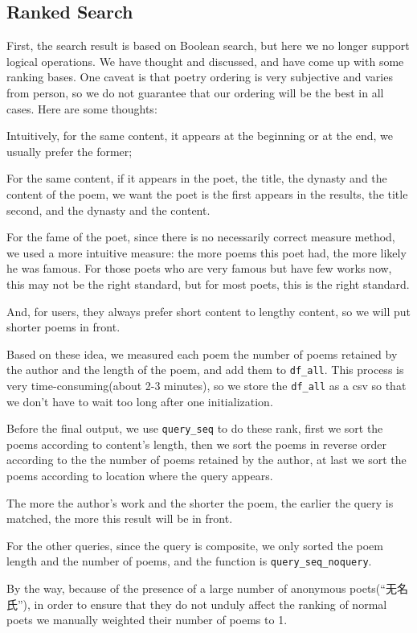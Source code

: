 \subsection{Ranked Search}

First, the search result is based on Boolean search, but here we no longer support logical operations. We have thought and discussed, and have come up with some ranking bases. One caveat is that poetry ordering is very subjective and varies from person, so we do not guarantee that our ordering will be the best in all cases. Here are some thoughts:

Intuitively, for the same content, it appears at the beginning or at the end, we usually prefer the former;

For the same content, if it appears in the poet, the title, the dynasty and the content of the poem, we want the poet is the first appears in the results, the title second, and the dynasty and the content.

For the fame of the poet, since there is no necessarily correct measure method, we used a more intuitive measure: the  more poems this poet had, the more likely he was famous. For those poets who are very famous but have few works now, this may not be the right standard, but for most poets, this is the right standard.

And, for users, they always prefer short content to lengthy content, so we will put shorter poems in front.

Based on these idea, we measured each poem the number of  poems retained by the author and the length of the poem, and add them to \lstinline{df_all}. This process is very time-consuming(about 2-3 minutes), so we store the \lstinline{df_all} as a csv so that we don't have to wait too long after one initialization.

Before the final output, we use \lstinline{query_seq} to do these rank, first we sort the poems according to content's length, then we sort the poems in reverse order according to the the number of poems retained by the author, at last we sort the poems according to location where the query appears.

The more the author's work and the shorter the poem, the earlier the query is matched, the more this result will be in front. 

For the other queries, since the query is composite, we only sorted the poem length and the number of poems, and the function is \lstinline{query_seq_noquery}.

By the way, because of the presence of a large number of anonymous poets(“无名氏”), in order to ensure that they do not unduly affect the ranking of normal poets we manually weighted their number of poems to 1.


